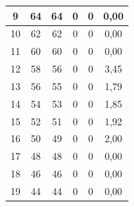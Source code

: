 \begin{longtable}{|c|c|c|c|c|c|}
 		9                                            & 64                     & 64                    & 0                     & 0                      & 0,00                                               \\ \hline
 		10                                           & 62                     & 62                    & 0                     & 0                      & 0,00                                               \\ \hline
 		11                                           & 60                     & 60                    & 0                     & 0                      & 0,00                                               \\ \hline
 		12                                           & 58                     & 56                    & 0                     & 0                      & 3,45                                               \\ \hline
 		13                                           & 56                     & 55                    & 0                     & 0                      & 1,79                                               \\ \hline
 		14                                           & 54                     & 53                    & 0                     & 0                      & 1,85                                               \\ \hline
 		15                                           & 52                     & 51                    & 0                     & 0                      & 1,92                                               \\ \hline
 		16                                           & 50                     & 49                    & 0                     & 0                      & 2,00                                               \\ \hline
 		17                                           & 48                     & 48                    & 0                     & 0                      & 0,00                                               \\ \hline
 		18                                           & 46                     & 46                    & 0                     & 0                      & 0,00                                               \\ \hline
 		19                                           & 44                     & 44                    & 0                     & 0                      & 0,00                                               \\ \hline

\end{longtable}
